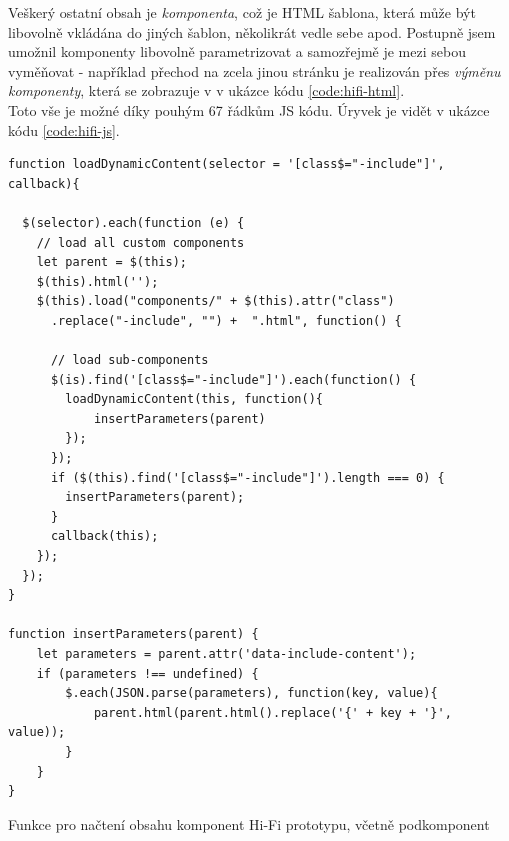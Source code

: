 Veškerý ostatní obsah je \emph{komponenta}, což je HTML šablona, která může být libovolně vkládána do jiných šablon, několikrát vedle sebe apod. Postupně jsem umožnil komponenty libovolně parametrizovat a samozřejmě je mezi sebou vyměňovat - například přechod na zcela jinou stránku je realizován přes \emph{výměnu komponenty}, která se zobrazuje v  v ukázce kódu \ref{code:hifi-html}.\\
Toto vše je možné díky pouhým 67 řádkům JS kódu. Úryvek je vidět v ukázce kódu \ref{code:hifi-js}.

\begin{listing}[H]
\begin{verbatim}
function loadDynamicContent(selector = '[class$="-include"]', callback){

  $(selector).each(function (e) {
    // load all custom components
    let parent = $(this);
    $(this).html('');
    $(this).load("components/" + $(this).attr("class")
      .replace("-include", "") +  ".html", function() {

      // load sub-components
      $(is).find('[class$="-include"]').each(function() {
        loadDynamicContent(this, function(){
            insertParameters(parent)
        });
      });
      if ($(this).find('[class$="-include"]').length === 0) {
        insertParameters(parent);
      }
      callback(this);
    });
  });
}

function insertParameters(parent) {
    let parameters = parent.attr('data-include-content');
    if (parameters !== undefined) {
        $.each(JSON.parse(parameters), function(key, value){
            parent.html(parent.html().replace('{' + key + '}', value));
        }
    }
}
\end{verbatim}
\caption[Funkce pro načtení obsahu komponent Hi-Fi prototypu]{Funkce pro načtení obsahu komponent Hi-Fi prototypu, včetně podkomponent} \label{code:hifi-js}
\end{listing}

